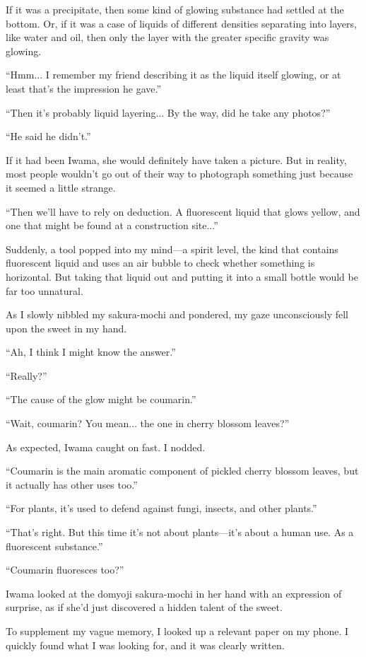 \documentclass[
    a4paper,
    12pt,
    twoside,
    openany,
    UTF8,
    fontset=windows
]{ctexbook}
\begin{document}
If it was a precipitate, then some kind of glowing substance had settled at the bottom. Or, if it was a case of liquids of different densities separating into layers, like water and oil, then only the layer with the greater specific gravity was glowing.

``Hmm... I remember my friend describing it as the liquid itself glowing, or at least that's the impression he gave.''

``Then it's probably liquid layering... By the way, did he take any photos?''

``He said he didn't.''

If it had been Iwama, she would definitely have taken a picture. But in reality, most people wouldn't go out of their way to photograph something just because it seemed a little strange.

``Then we'll have to rely on deduction. A fluorescent liquid that glows yellow, and one that might be found at a construction site...''

Suddenly, a tool popped into my mind---a spirit level, the kind that contains fluorescent liquid and uses an air bubble to check whether something is horizontal. But taking that liquid out and putting it into a small bottle would be far too unnatural.

As I slowly nibbled my sakura-mochi and pondered, my gaze unconsciously fell upon the sweet in my hand.

``Ah, I think I might know the answer.''

``Really?''

``The cause of the glow might be coumarin.''

``Wait, coumarin? You mean... the one in cherry blossom leaves?''

As expected, Iwama caught on fast. I nodded.

``Coumarin is the main aromatic component of pickled cherry blossom leaves, but it actually has other uses too.''

``For plants, it's used to defend against fungi, insects, and other plants.''

``That's right. But this time it's not about plants---it's about a human use. As a fluorescent substance.''

``Coumarin fluoresces too?''

Iwama looked at the domyoji sakura-mochi in her hand with an expression of surprise, as if she'd just discovered a hidden talent of the sweet.

To supplement my vague memory, I looked up a relevant paper on my phone. I quickly found what I was looking for, and it was clearly written.
\end{document}
